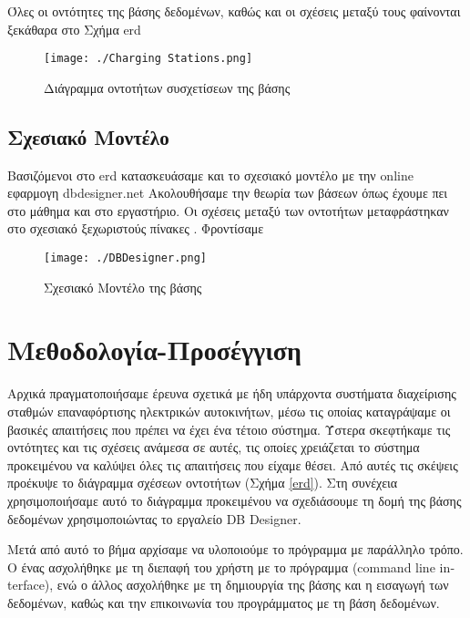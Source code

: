 \documentclass[manuscript,screen,review]{acmart}
\newcommand{\en}[1]{\foreignlanguage{english}{#1}}
\begin{document}
\noindent
Όλες οι οντότητες της βάσης δεδομένων, καθώς και οι σχέσεις μεταξύ τους φαίνονται
ξεκάθαρα στο Σχήμα \en{erd}


\begin{figure}[H]
    \centering
    \texttt{[image: ./Charging Stations.png]}
    \caption{Διάγραμμα οντοτήτων συσχετίσεων της βάσης}
\end{figure}


\newpage
\subsection{Σχεσιακό Μοντέλο }

Βασιζόμενοι στο \en{erd} κατασκευάσαμε και το σχεσιακό μοντέλο με την \en{online } εφαρμογη \en{dbdesigner.net}
Ακολουθήσαμε την θεωρία των βάσεων όπως έχουμε πει στο μάθημα και στο εργαστήριο.
Οι σχέσεις μεταξύ των οντοτήτων μεταφράστηκαν στο σχεσιακό ξεχωριστούς πίνακες . 
Φροντίσαμε 


\begin{figure}[H]
    \centering
    \texttt{[image: ./DBDesigner.png]}
    \caption{Σχεσιακό Μοντέλο της βάσης}
\end{figure}

\newpage


\section{Μεθοδολογία-Προσέγγιση}
\label{method}

Αρχικά πραγματοποιήσαμε έρευνα σχετικά με ήδη υπάρχοντα συστήματα διαχείρισης σταθμών
επαναφόρτισης ηλεκτρικών αυτοκινήτων, μέσω τις οποίας καταγράψαμε οι βασικές απαιτήσεις
που πρέπει να έχει ένα τέτοιο σύστημα. Ύστερα σκεφτήκαμε τις οντότητες και τις σχέσεις
ανάμεσα σε αυτές, τις οποίες χρειάζεται το σύστημα προκειμένου να καλύψει όλες τις
απαιτήσεις που είχαμε θέσει. Από αυτές τις σκέψεις προέκυψε το διάγραμμα σχέσεων
οντοτήτων (Σχήμα \ref{erd}). Στη συνέχεια χρησιμοποιήσαμε αυτό το διάγραμμα προκειμένου
να σχεδιάσουμε τη δομή της βάσης δεδομένων χρησιμοποιώντας το εργαλείο DB Designer.

Μετά από αυτό το βήμα αρχίσαμε να υλοποιούμε το πρόγραμμα με παράλληλο τρόπο. Ο ένας
ασχολήθηκε με τη διεπαφή του χρήστη με το πρόγραμμα \en{(command line interface)}, ενώ
ο άλλος ασχολήθηκε με τη δημιουργία της βάσης και η εισαγωγή των δεδομένων, καθώς και
την επικοινωνία του προγράμματος με τη βάση δεδομένων.\newline\newline 
\end{document}
